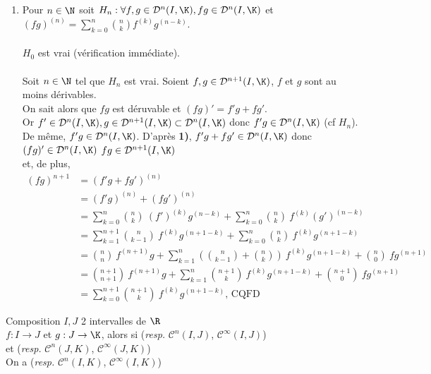 \documentclass[12pt,a4paper]{report}
\begin{document}
\begin{demo}
\begin{enumerate}
	\item Pour $n \in \N$ soit $H_n : \forall f,g \in \mathcal{D}^n(I,\K), fg \in \mathcal{D}^n(I,\K)$ et $(fg)^{(n)} = \displaystyle{\sum_{k=0}^{n} \binom{n}{k} f^{(k)}g^{(n-k)}}$. \\ \\
	$H_0$ est vrai (vérification immédiate). \\ \\
	Soit $n \in \N$ tel que $H_n$ est vrai. Soient $f,g \in \mathcal{D}^{n+1}(I,\K)$, $f$ et $g$ sont au moins dérivables. \\
	On sait alors que $fg$ est déruvable et $(fg)' = f'g+fg'$. \\
	Or $f' \in \mathcal{D}^{n}(I,\K), g \in \mathcal{D}^{n+1}(I,\K) \subset \mathcal{D}^{n}(I,\K)$ donc $f'g \in \mathcal{D}^n(I,\K)$ (cf $H_n$). \\
	De même, $f'g \in \mathcal{D}^{n}(I,\K)$. D'après \textbf{1)}, $f'g+fg' \in \mathcal{D}^{n}(I,\K)$ donc $(fg)' \in \mathcal{D}^{n}(I,\K)$ \ie $fg \in \mathcal{D}^{n+1}(I,\K)$ \\
	et, de plus, 
	\begin{align*}
	(fg)^{n+1} &= (f'g+fg')^{(n)} \\
	&= (f'g)^{(n)} + (fg')^{(n)} \\
	&= \displaystyle{\sum_{k=0}^{n} \binom{n}{k} \: (f')^{(k)} g^{(n-k)} + \sum_{k=0}^{n} \binom{n}{k} \: f^{(k)}(g')^{(n-k)}} \\
	&= \displaystyle{\sum_{k=1}^{n+1} \binom{n}{k-1} \: f^{(k)} g^{(n+1-k)} + \sum_{k=0}^{n}\binom{n}{k} \: f^{(k)}g^{(n+1-k)}} \\
	&= \displaystyle{\binom{n}{n} \: f^{(n+1)}g + \sum_{k=1}^{n}\left(\binom{n}{k-1}+\binom{n}{k}\right) \: f^{(k)}g^{(n+1-k)} + \binom{n}{0} \: f g^{(n+1)}} \\
	&= \displaystyle{\binom{n+1}{n+1} \: f^{(n+1)}g + \sum_{k=1}^{n} \binom{n+1}{k} \: f^{(k)}g^{(n+1-k)} + \binom{n+1}{0} \: fg^{(n+1)}} \\
	&=\displaystyle{\sum_{k=0}^{n+1} \binom{n+1}{k} \: f^{(k)}g^{(n+1-k)}} \text{, CQFD}
	\end{align*}
\end{enumerate}
\end{demo}


\begin{theoreme}{Composition}{}
$I, J$ 2 intervalles de $\R$\\
$f:I \to J$ et $g:J\to \K$, alors si  (\textit{resp.} $\mathcal{C}^n(I,J)$, $\mathcal{C}^\infty(I,J)$) \\
et  (\textit{resp.} $\mathcal{C}^n(J,K)$, $\mathcal{C}^\infty(J,K)$)\\
On a  (\textit{resp.} $\mathcal{C}^n(I,K)$, $\mathcal{C}^\infty(I,K)$)
\end{theoreme}
\end{document}
